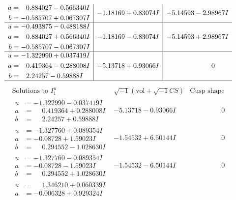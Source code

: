 \documentclass[1p]{elsarticle_modified}
\theoremstyle{definition}
\newcommand{\I}{\sqrt{-1}}
\begin{document}
$$\begin{array}{c|c|c}
\begin{aligned}
a &= \phantom{-}0.884027 - 0.566340 I \\
b &= -0.585707 + 0.067307 I\end{aligned}
 & -1.18169 + 0.83074 I & -5.14593 - 2.98967 I \\ \hline\begin{aligned}
u &= -0.493875 - 0.488188 I \\
a &= \phantom{-}0.884027 + 0.566340 I \\
b &= -0.585707 - 0.067307 I\end{aligned}
 & -1.18169 - 0.83074 I & -5.14593 + 2.98967 I \\ \hline\begin{aligned}
u &= -1.322990 + 0.037419 I \\
a &= \phantom{-}0.419364 - 0.288008 I \\
b &= \phantom{-}2.24257 - 0.59888 I\end{aligned}
 & -5.13718 + 0.93066 I & \phantom{-0.000000 } 0\\
 \hline 
 \end{array}$$\newpage$$\begin{array}{c|c|c}  
\text{Solutions to }I^u_{1}& \I (\text{vol} + \sqrt{-1}CS) & \text{Cusp shape}\\
 \hline 
\begin{aligned}
u &= -1.322990 - 0.037419 I \\
a &= \phantom{-}0.419364 + 0.288008 I \\
b &= \phantom{-}2.24257 + 0.59888 I\end{aligned}
 & -5.13718 - 0.93066 I & \phantom{-0.000000 } 0 \\ \hline\begin{aligned}
u &= -1.327760 + 0.089354 I \\
a &= -0.08728 + 1.59023 I \\
b &= \phantom{-}0.294552 - 1.028630 I\end{aligned}
 & -1.54532 + 6.50144 I & \phantom{-0.000000 } 0 \\ \hline\begin{aligned}
u &= -1.327760 - 0.089354 I \\
a &= -0.08728 - 1.59023 I \\
b &= \phantom{-}0.294552 + 1.028630 I\end{aligned}
 & -1.54532 - 6.50144 I & \phantom{-0.000000 } 0 \\ \hline\begin{aligned}
u &= \phantom{-}1.346210 + 0.060339 I \\
a &= -0.006328 + 0.929324 I \\

\end{aligned}
\end{array}$$
\end{document}

